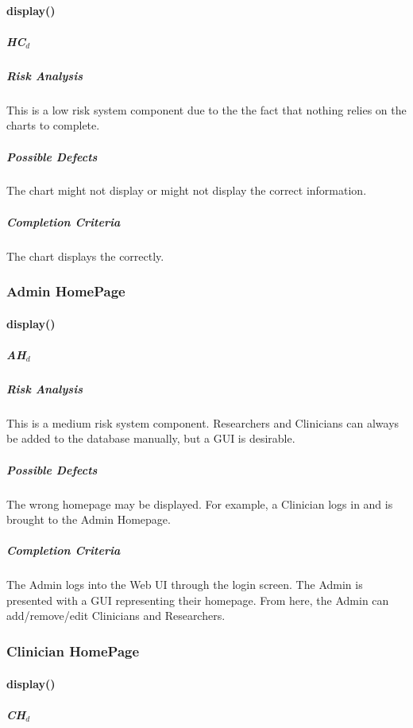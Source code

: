 \documentclass{article}
\begin{document}
\paragraph{display()}

\subparagraph{HC$_{d}$}

\subparagraph{Risk Analysis}
This is a low risk system component due to the the fact that nothing relies on the charts to complete.

\subparagraph{Possible Defects}
The chart might not display or might not display the correct information.

\subparagraph{Completion Criteria}
The chart displays the correctly.


\subsubsection{Admin HomePage}

\paragraph{display()}

\subparagraph{AH$_{d}$}

\subparagraph{Risk Analysis}
This is a medium risk system component. Researchers and Clinicians can always be added to the database manually, but a GUI is desirable.

\subparagraph{Possible Defects}
The wrong homepage may be displayed. For example, a Clinician logs in and is brought to the Admin Homepage. 

\subparagraph{Completion Criteria}
The Admin logs into the Web UI through the login screen. The Admin is presented with a GUI representing their homepage. From here,
the Admin can add/remove/edit Clinicians and Researchers.

\subsubsection{Clinician HomePage}

\paragraph{display()}

\subparagraph{CH$_{d}$}
\end{document}
